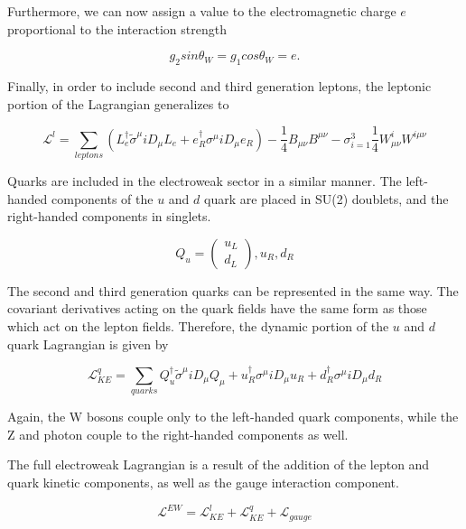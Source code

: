 Furthermore, we can now assign a value to the electromagnetic charge $e$ proportional to the interaction strength

\begin{equation}
g_{2}sin\theta_{W}=g_{1}cos\theta_{W}=e.
\end{equation}

Finally, in order to include second and third generation leptons, the leptonic portion of the Lagrangian generalizes to 

\begin{equation}
\mathcal{L}^{l} = \sum_{leptons}(L_{e}^{\dagger}\tilde{\sigma}^{\mu}iD_{\mu}L_{e}+e_{R}^{\dagger}\sigma^{\mu}iD_{\mu}e_{R}) - \frac{1}{4}B_{\mu\nu}B^{\mu\nu}- \sigma_{i=1}^{3}\frac{1}{4}W_{\mu\nu}^{i}W^{i\mu\nu}
\end{equation}

Quarks are included in the electroweak sector in a similar manner. The left-handed components of the $u$ and $d$ quark are placed in SU(2) doublets, and the right-handed components in singlets.

\begin{equation}
Q_{u} = \begin{pmatrix}
	u_{L} \\
	d_{L}
\end{pmatrix}, u_{R}, d_{R}
\end{equation}

The second and third generation quarks can be represented in the same way. The covariant derivatives acting on the quark fields have the same form as those which act on the lepton fields. Therefore, the dynamic portion of the $u$ and $d$ quark Lagrangian is given by

\begin{equation}
\label{Lquark}
\mathcal{L}^{q}_{KE} = \sum_{quarks}Q_{u}^{\dagger}\tilde{\sigma}^{\mu}iD_{\mu}Q_{\mu}+u_{R}^{\dagger}\sigma^{\mu}iD_{\mu}u_{R}+d^{\dagger}_{R}\sigma^{\mu}iD_{\mu}d_{R}
\end{equation}

Again, the W bosons couple only to the left-handed quark components, while the Z and photon couple to the right-handed components as well.

The full electroweak Lagrangian is a result of the addition of the lepton and quark kinetic components, as well as the gauge interaction component.

\begin{equation}
\mathcal{L}^{EW} = \mathcal{L}^{l}_{KE} + \mathcal{L}_{KE}^{q} + \mathcal{L}_{gauge}
\end{equation}

